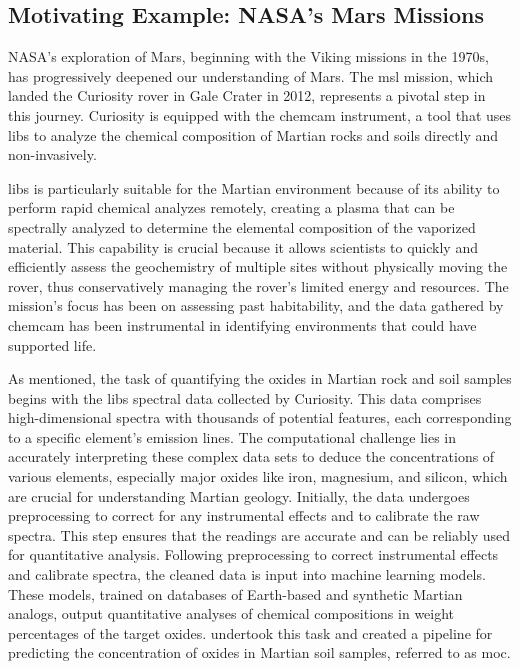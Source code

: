 \subsection{Motivating Example: NASA's Mars Missions}
NASA's exploration of Mars, beginning with the Viking missions in the 1970s, has progressively deepened our understanding of Mars\cite{marsnasagov_vikings}. The \gls{msl} mission, which landed the Curiosity rover in Gale Crater in 2012, represents a pivotal step in this journey. Curiosity is equipped with the \gls{chemcam} instrument, a tool that uses \gls{libs} to analyze the chemical composition of Martian rocks and soils directly and non-invasively\cite{chemcamNasaWebsite}.

\gls{libs} is particularly suitable for the Martian environment because of its ability to perform rapid chemical analyzes remotely, creating a plasma that can be spectrally analyzed to determine the elemental composition of the vaporized material. This capability is crucial because it allows scientists to quickly and efficiently assess the geochemistry of multiple sites without physically moving the rover, thus conservatively managing the rover's limited energy and resources. The mission's focus has been on assessing past habitability, and the data gathered by \gls{chemcam} has been instrumental in identifying environments that could have supported life\cite{chemcamNasaWebsite,curiosityNasaWebsite}.

As mentioned, the task of quantifying the oxides in Martian rock and soil samples begins with the \gls{libs} spectral data collected by Curiosity. This data comprises high-dimensional spectra with thousands of potential features, each corresponding to a specific element's emission lines. The computational challenge lies in accurately interpreting these complex data sets to deduce the concentrations of various elements, especially major oxides like iron, magnesium, and silicon, which are crucial for understanding Martian geology.
Initially, the data undergoes preprocessing to correct for any instrumental effects and to calibrate the raw spectra. This step ensures that the readings are accurate and can be reliably used for quantitative analysis. 
Following preprocessing to correct instrumental effects and calibrate spectra, the cleaned data is input into machine learning models. These models, trained on databases of Earth-based and synthetic Martian analogs, output quantitative analyses of chemical compositions in weight percentages of the target oxides\cite{wiensPreflightCalibrationInitial2013, cleggRecalibrationMarsScience2017}.
\citet{cleggRecalibrationMarsScience2017} undertook this task and created a pipeline for predicting the concentration of oxides in Martian soil samples, referred to as \gls{moc}.

